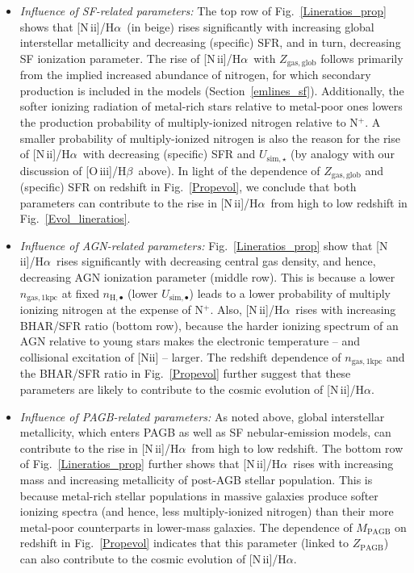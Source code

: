 \documentclass[fleqn,usenatbib]{mnras}
\newcommand{\oiiihb}{\hbox{[O\,{\sc iii}]/H$\beta$}}
\newcommand{\niiha}{\hbox{[N\,{\sc ii}]/H$\alpha$}}
\begin{document}
\begin{itemize}

\item{\it Influence of SF-related parameters:}
The top row of Fig.~\ref{Lineratios_prop} shows that \niiha\ (in
beige)  rises significantly with increasing global interstellar
metallicity and decreasing (specific) SFR, and in turn, decreasing SF
ionization parameter. The rise of \niiha\ with $Z_{\mathrm{gas,
    glob}}$ follows primarily from the implied  increased abundance
of nitrogen, for which secondary production is included in the models
(Section~\ref{emlines_sf}). Additionally, the softer ionizing
radiation of metal-rich stars relative to metal-poor ones lowers the
production probability of multiply-ionized nitrogen relative to
N$^+$. A smaller probability of  multiply-ionized nitrogen is also the
reason for the rise of  \niiha\  with decreasing (specific) SFR and
$U_{\mathrm{sim,\star}}$ (by analogy with  our discussion of \oiiihb\
above). In light of the dependence of  $Z_{\mathrm{gas, glob}}$ and
(specific) SFR on redshift in Fig.~\ref{Propevol},  we conclude that
both parameters can contribute to the rise in \niiha\ from  high to
low redshift in Fig.~\ref{Evol_lineratios}. 

\item{\it Influence of AGN-related parameters:}
%
Fig.~\ref{Lineratios_prop} show that \niiha\  rises significantly with
decreasing  central gas density, and hence, decreasing AGN ionization
parameter (middle row). This is because a lower $n_{\mathrm{gas,
    1kpc}}$ at fixed $n_{\mathrm{H},\bullet}$  (lower
$U_{\mathrm{sim,\bullet}}$) leads to a lower probability of multiply
ionizing nitrogen at the expense of N$^+$. Also, \niiha\ rises with
increasing BHAR/SFR ratio  (bottom row), because the harder ionizing
spectrum of an AGN relative to young stars makes the electronic
temperature -- and collisional excitation of [N{\sc ii}] --
larger. The redshift dependence of $n_{\mathrm{gas, 1kpc}}$ and the
BHAR/SFR ratio in Fig.~\ref{Propevol} further suggest that these
parameters are likely to contribute to  the cosmic evolution of \niiha. 

\item{\it Influence of PAGB-related parameters:}
%
As noted above, global interstellar metallicity, which enters PAGB as
well  as SF nebular-emission models, can contribute to the rise in
\niiha\ from high to low redshift. The bottom row of
Fig.~\ref{Lineratios_prop} further  shows that \niiha\ rises with
increasing mass and increasing  metallicity of post-AGB stellar
population. This is because metal-rich stellar  populations in massive
galaxies produce softer ionizing spectra (and hence,  less
multiply-ionized nitrogen) than their more metal-poor counterparts in
lower-mass galaxies. The dependence of $M_\mathrm{PAGB}$ on redshift
in Fig.~\ref{Propevol} indicates that this parameter (linked to
$Z_\mathrm{PAGB}$)  can also contribute to the cosmic evolution of
\niiha. 


\end{itemize}
\end{document}
